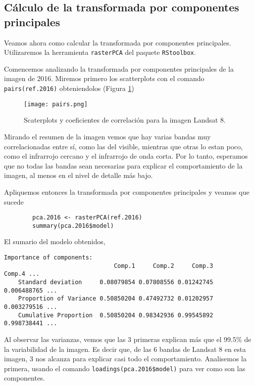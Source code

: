 \subsection{C\'alculo de la transformada por componentes principales}

Veamos ahora como calcular la transformada por componentes principales. Utilizaremos la
herramienta \texttt{rasterPCA} del paquete \texttt{RStoolbox}.

\begin{exa}
    Comencemos analizando la transformada por componentes principales de la
    imagen de 2016. Miremos primero los scatterplots con el comando \texttt{pairs(ref.2016)}
    obteniendolos (Figura \ref{fig:pairs2})
    \begin{figure}[h!]
    \begin{center}
        \texttt{[image: pairs.png]}
    \end{center}
    \caption{Scaterplots y coeficientes de correlaci\'on para la imagen Landsat 8.}
    \label{fig:pairs2}
    \end{figure}

    Mirando el resumen de la imagen vemos que hay varias bandas muy
    correlacionadas entre s\'i, como las del visible, mientras que otras lo
    estan poco, como el infrarrojo cercano y el infrarrojo de onda corta. Por lo tanto, esperamos que no
    todas las bandas sean necesarias para explicar el comportamiento de la
    imagen, al menos en el nivel de detalle m\'as bajo.

    Apliquemos entonces la transformada por componentes principales y veamos que
    sucede

    \begin{lstlisting}
        pca.2016 <- rasterPCA(ref.2016)
        summary(pca.2016$model)
    \end{lstlisting}

    El sumario del modelo obtenidos,
    \begin{Verbatim}[fontsize=\small]
    Importance of components:
                               Comp.1     Comp.2     Comp.3      Comp.4 ...
    Standard deviation     0.08079854 0.07808556 0.01242745 0.006488765 ...
    Proportion of Variance 0.50850204 0.47492732 0.01202957 0.003279516 ...
    Cumulative Proportion  0.50850204 0.98342936 0.99545892 0.998738441 ...
    \end{Verbatim}

    Al observar las varianzas, vemos que las 3 primeras explican m\'as que el
    99.5\% de la variabilidad de la imagen. Es decir que, de las 6 bandas de
    Landsat 8 en esta imagen, 3 nos alcanza para explicar casi todo el
    comportamiento. Analisemos la primera, usando el comando
    \texttt{loadings(pca.2016\$model)} para ver como son las componentes.


\end{exa}
